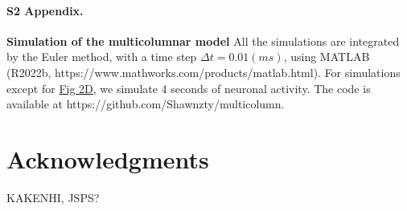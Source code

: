 \documentclass[10pt,letterpaper]{article}
\begin{document}
\paragraph*{S2 Appendix.}
\label{S2_Appendix}
{\bf Simulation of the multicolumnar model} All the simulations are integrated by the Euler method, with a time step $\Delta t=0.01 (ms)$, using MATLAB (R2022b, https://www.mathworks.com/products/matlab.html). For simulations except for \hyperlink{fig:fig2}{Fig 2D}, we simulate 4 seconds of neuronal activity. The code is available at https://github.com/Shawnzty/multicolumn.

\section*{Acknowledgments}
KAKENHI, JSPS?

\nolinenumbers
\end{document}
